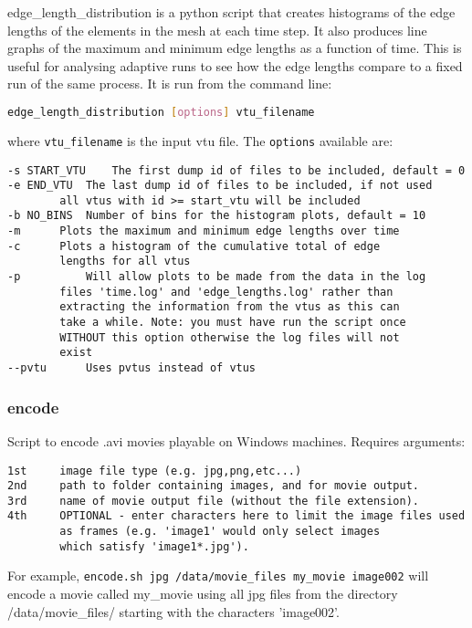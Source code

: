 edge\_length\_distribution is a python script that creates histograms of the edge lengths of the elements in the mesh at each time step. It also produces line graphs of the maximum and minimum edge lengths as a function of time. This is useful for analysing adaptive runs to see how the edge lengths compare to a fixed run of the same process.  It is run from the command line:
\begin{lstlisting}[language = Bash]
edge_length_distribution [options] vtu_filename
\end{lstlisting}
where \lstinline[language = Python]+vtu_filename+ is the input vtu file. The \lstinline[language = Bash]+options+ available are:
\begin{lstlisting}
-s START_VTU	The first dump id of files to be included, default = 0
-e END_VTU	The last dump id of files to be included, if not used
		all vtus with id >= start_vtu will be included
-b NO_BINS	Number of bins for the histogram plots, default = 10
-m		Plots the maximum and minimum edge lengths over time
-c		Plots a histogram of the cumulative total of edge
		lengths for all vtus
-p        	Will allow plots to be made from the data in the log
		files 'time.log' and 'edge_lengths.log' rather than
		extracting the information from the vtus as this can
		take a while. Note: you must have run the script once
		WITHOUT this option otherwise the log files will not
		exist
--pvtu		Uses pvtus instead of vtus

\end{lstlisting}


\subsubsection{encode}
\label{sec:encode}
Script to encode .avi movies playable on Windows machines. Requires arguments:
\begin{lstlisting}
1st     image file type (e.g. jpg,png,etc...)
2nd     path to folder containing images, and for movie output.
3rd     name of movie output file (without the file extension).
4th     OPTIONAL - enter characters here to limit the image files used
        as frames (e.g. 'image1' would only select images
        which satisfy 'image1*.jpg').
\end{lstlisting}

For example, \texttt{encode.sh jpg /data/movie\_files my\_movie image002} will encode a movie called my\_movie using all jpg files from the directory /data/movie\_files/ starting with the characters 'image002'.


